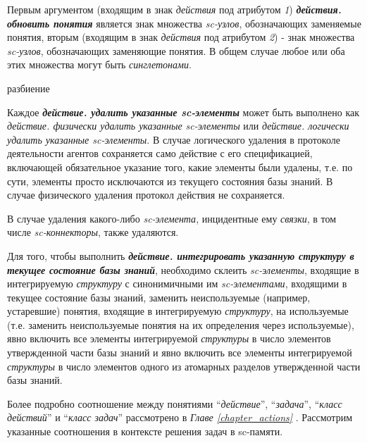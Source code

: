 Первым аргументом (входящим в знак \textit{действия} под атрибутом \textit{1\scnrolesign}) \textbf{\textit{действия. обновить понятия}} является знак множества \textit{sc-узлов}, обозначающих заменяемые понятия, вторым (входящим в знак \textit{действия} под атрибутом \textit{2\scnrolesign}) - знак множества \textit{sc-узлов}, обозначающих заменяющие понятия. В общем случае любое или оба этих множества могут быть \textit{синглетонами}.

\begin{SCn}
\begin{scnrelfromset}{разбиение}
\end{scnrelfromset}
\end{SCn}

Каждое \textbf{\textit{действие. удалить указанные sc-элементы}} может быть выполнено как \textit{действие. физически удалить указанные sc-элементы} или \textit{действие. логически удалить указанные sc-элементы}. В случае логического удаления в протоколе деятельности агентов сохраняется само действие с его спецификацией, включающей обязательное указание того, какие элементы были удалены, т.е. по сути, элементы просто исключаются из текущего состояния базы знаний. В случае физического удаления протокол действия не сохраняется.
	
В случае удаления какого-либо \textit{sc-элемента}, инцидентные ему \textit{связки}, в том числе \textit{sc-коннекторы}, также удаляются.

Для того, чтобы выполнить \textbf{\textit{действие. интегрировать указанную структуру в текущее состояние базы знаний}}, необходимо склеить \textit{sc-элементы}, входящие в интегрируемую \textit{структуру} с синонимичными им \textit{sc-элементами}, входящими в текущее состояние базы знаний, заменить неиспользуемые (например, устаревшие) понятия, входящие в интегрируемую \textit{структуру}, на используемые (т.е. заменить неиспользуемые понятия на их определения через используемые), явно включить все элементы интегрируемой \textit{структуры} в число элементов утвержденной части базы знаний и явно включить все элементы интегрируемой \textit{структуры} в число элементов одного из атомарных разделов утвержденной части базы знаний.

Более подробно соотношение между понятиями ``\textit{действие}'', ``\textit{задача}'', ``\textit{класс действий}'' и ``\textit{класс задач}'' рассмотрено в \textit{Главе \ref{chapter_actions} }. Рассмотрим указанные соотношения в контексте решения задач в sc-памяти.

